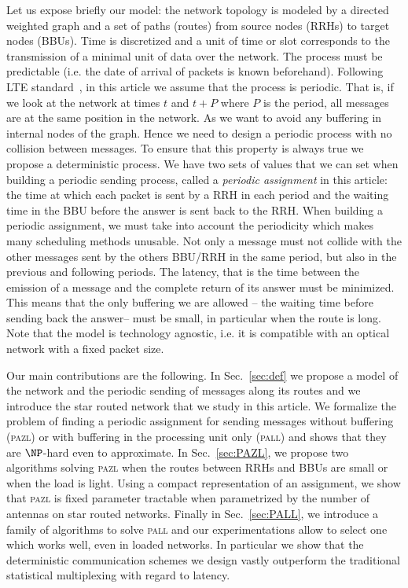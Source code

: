 \documentclass[10pt, conference, letterpaper]{IEEEtran}
\newcommand\pazl{\textsc{pazl}\xspace}
\newcommand\pall{\textsc{pall}\xspace}
\begin{document}
Let us expose briefly our model: the network topology is modeled by a directed weighted graph and a set of paths (routes) from source nodes (RRHs) to target nodes (BBUs). Time is discretized and a unit of time or slot corresponds to the transmission of a minimal unit of data over the network. The process must be  predictable (i.e. the date of arrival of packets is known beforehand). Following LTE standard~\cite{bouguen2012lte}, in this article we assume that the process is periodic. That is, if we look at the network at times $t$ and $t+P$ where $P$ is the period, all messages are at the same position in the network. As we want to avoid any  buffering in internal nodes of the graph. Hence we need to design a periodic process with no collision between messages. To ensure that this property is always true we propose a deterministic process.  We have two sets of values that we can set when building a periodic sending process, called a \emph{periodic assignment} in this article: the time at which each packet is sent by a RRH in each period and the waiting time in the BBU before the answer is sent back to the RRH. When building a periodic assignment, we must take into account the periodicity which makes many scheduling methods unusable. Not only a message must not collide with the other messages sent by the others BBU/RRH in the same period, but also in the previous and following periods. The latency, that is the time between the emission of a message and the complete return of its answer must be minimized. This means that the only buffering we are allowed -- the waiting time before sending back the answer-- must be small, in particular when the route is long. Note that the model is technology agnostic, i.e. it is compatible with an optical network with a fixed packet size.   

Our main contributions are the following.
 In Sec.~\ref{sec:def} we propose a model of the network and the periodic sending of messages along its routes  and we introduce the star routed network that we study in this article. 
 We formalize the problem of finding a periodic assignment for sending messages without buffering (\pazl) or with buffering in the processing unit only (\pall) and shows that they are $\NP$-hard even to approximate. In Sec.~\ref{sec:PAZL}, we propose two algorithms solving \pazl when the routes between RRHs and BBUs are small or when the load is light. Using a compact representation of an assignment, we show that \pazl is fixed parameter tractable when parametrized by the number of antennas on star routed networks. Finally in Sec.~\ref{sec:PALL}, we introduce a family of algorithms to solve \pall and our experimentations allow to select one which works well, even in loaded networks. In particular we show that the deterministic communication schemes we design vastly outperform the traditional statistical multiplexing with regard to latency. 
\end{document}
